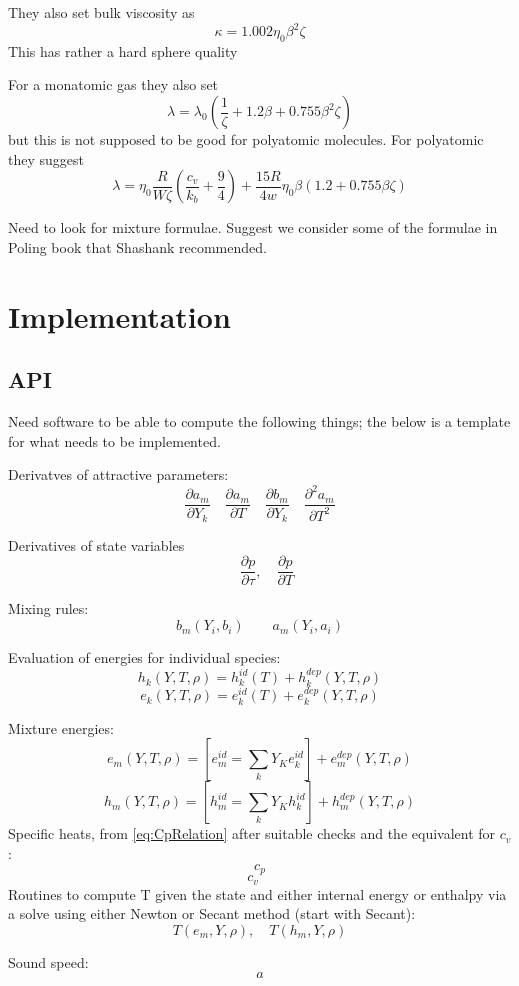 \documentclass[11pt]{article}
\newcommand{\MarginPar}[1]{\marginpar{%
\vskip-\baselineskip %
\raggedright\tiny\sffamily
\hrule\smallskip{\color{red}#1}\par\smallskip\hrule}}
\begin{document}
They also set bulk viscosity as
\[
\kappa = 1.002 \eta_0 \beta^2 \zeta
\]
This has rather a hard sphere quality

For a monatomic gas they also set
\[
\lambda = \lambda_0 (\frac{1}{\zeta} + 1.2 \beta + 0.755 \beta^2 \zeta)
\]
but this is not supposed to be good for polyatomic molecules.
For polyatomic they suggest
\[
\lambda = \eta_0 \frac{R}{W \zeta} \left(\frac{c_v}{k_b} + \frac{9}{4} \right)
+ \frac{15 R}{4 w} \eta_0 \beta \left( 1.2 + 0.755 \beta \zeta \right ) 
\]

Need to look for mixture formulae.  Suggest we consider some of the formulae in Poling book that Shashank
recommended.

    \section{Implementation}
    \subsection{API}
    \label{sec:api}
Need software to be able to compute the following things; the below is a template for what needs to be implemented. 

Derivatves of attractive parameters:
\[
\frac{\partial a_m}{\partial Y_k} \quad \frac{\partial a_m}{\partial T} \quad \frac{\partial b_m}{\partial Y_k} \quad \frac{\partial^2 a_m}{\partial T^2}
\]

Derivatives of state variables
\[
\quad \frac{\partial p}{\partial \tau}, \quad \frac{\partial p}{\partial T}
\]

Mixing rules:
\[
b_m(Y_i,b_i) \qquad a_m(Y_i,a_i)
\]

Evaluation of energies for individual species:
\[
\label{eq:hk}
h_k(Y, T, \rho) = h_k^{id}(T) + h_k^{dep}(Y,T,\rho)
\]
\[
\label{eq:ek}
e_k(Y, T, \rho) = e_k^{id}(T) + e_k^{dep}(Y,T,\rho)
\]

Mixture energies:
\[
e_m(Y, T, \rho) = \left[e_m^{id} = \sum_k Y_Ke_k^{id}\right] + e_m^{dep}(Y,T,\rho)
\]
\[
h_m(Y, T, \rho) = \left[h_m^{id} = \sum_k Y_Kh_k^{id}\right] + h_m^{dep}(Y,T,\rho)
\]
Specific heats, from \ref{eq:CpRelation} after suitable checks and the equivalent for $c_v$:
\[
c_p 
\]
\[
c_v \quad 
\]\MarginPar{check if we really need $c_v$}
Routines to compute T given the state and either internal energy or enthalpy via a solve using either Newton or Secant method (start with Secant):
\[
T(e_m,Y,\rho), \quad T(h_m,Y,\rho)
\]

Sound speed:
\[
a
\]
\end{document}
